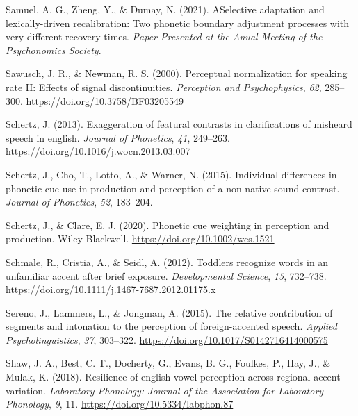 \documentclass[
  11pt,
  english,
  man,floatsintext]{apa6}
\newlength{\cslhangindent}
\newlength{\cslentryspacingunit} %
\newenvironment{CSLReferences}[2] %
 {%
  \setlength{\parindent}{0pt}
  \ifodd #1
  \let\oldpar\par
  \def\par{\hangindent=\cslhangindent\oldpar}
  \fi
  \setlength{\parskip}{#2\cslentryspacingunit}
 }%
 {}
\begin{document}
\begin{CSLReferences}{1}{0}
\leavevmode{}%
Samuel, A. G., Zheng, Y., \& Dumay, N. (2021). ASelective adaptation and lexically-driven recalibration: Two phonetic boundary adjustment processes with very different recovery times. \emph{Paper Presented at the Anual Meeting of the Psychonomics Society}.

\leavevmode{}%
Sawusch, J. R., \& Newman, R. S. (2000). Perceptual normalization for speaking rate II: Effects of signal discontinuities. \emph{Perception and Psychophysics}, \emph{62}, 285--300. \url{https://doi.org/10.3758/BF03205549}

\leavevmode{}%
Schertz, J. (2013). Exaggeration of featural contrasts in clarifications of misheard speech in english. \emph{Journal of Phonetics}, \emph{41}, 249--263. \url{https://doi.org/10.1016/j.wocn.2013.03.007}

\leavevmode{}%
Schertz, J., Cho, T., Lotto, A., \& Warner, N. (2015). Individual differences in phonetic cue use in production and perception of a non-native sound contrast. \emph{Journal of Phonetics}, \emph{52}, 183--204.

\leavevmode{}%
Schertz, J., \& Clare, E. J. (2020). Phonetic cue weighting in perception and production. Wiley-Blackwell. \url{https://doi.org/10.1002/wcs.1521}

\leavevmode{}%
Schmale, R., Cristia, A., \& Seidl, A. (2012). Toddlers recognize words in an unfamiliar accent after brief exposure. \emph{Developmental Science}, \emph{15}, 732--738. \url{https://doi.org/10.1111/j.1467-7687.2012.01175.x}

\leavevmode{}%
Sereno, J., Lammers, L., \& Jongman, A. (2015). The relative contribution of segments and intonation to the perception of foreign-accented speech. \emph{Applied Psycholinguistics}, \emph{37}, 303--322. \url{https://doi.org/10.1017/S0142716414000575}

\leavevmode{}%
Shaw, J. A., Best, C. T., Docherty, G., Evans, B. G., Foulkes, P., Hay, J., \& Mulak, K. (2018). Resilience of english vowel perception across regional accent variation. \emph{Laboratory Phonology: Journal of the Association for Laboratory Phonology}, \emph{9}, 11. \url{https://doi.org/10.5334/labphon.87}


\end{CSLReferences}
\end{document}
